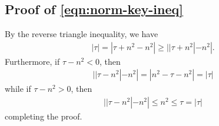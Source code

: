 \documentclass[12pt,reqno]{amsart}
\numberwithin{equation}{section}  %
\begin{document}
\begin{appendices}
\subsection{Proof of \eqref{eqn:norm-key-ineq}}
\label{ssec:pf-mod-princ}
By the reverse triangle inequality, we have
%
%
\begin{equation*}
\begin{split}
  | \tau | = | \tau + n^{2} - n^{2} | \ge | | \tau + n^{2} | - n^{2} |.
\end{split}
\end{equation*}
%
%
Furthermore, if $\tau - n^{2} < 0$, then
%
%
\begin{equation*}
\begin{split}
  | | \tau - n^{2} | - n^{2} | = | n^{2} - \tau - n^{2} | = | \tau |
\end{split}
\end{equation*}
%
%
while if $\tau - n^{2} > 0$, then
%
%
\begin{equation*}
\begin{split}
  | | \tau - n^{2} | - n^{2} | \le n^{2} \le \tau = |\tau|
\end{split}
\end{equation*}
%
%
completing the proof. \qquad \qedsymbol
%
%

\end{appendices}
\end{document}
